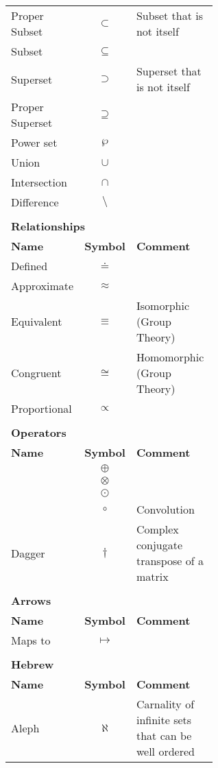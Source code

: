 \documentclass[12pt, english]{book}
\begin{document}
\begin{tabularx}{\textwidth}{ l c p{0.6\linewidth}}
 		Proper Subset 			& $\subset$			& Subset that is not itself \\
 		Subset 					& $\subseteq$		& \\
 		Superset 				& $\supset$ 		& Superset that is not itself\\
 		Proper Superset 		& $\supseteq$		& \\
 		Power set				& $\wp$				& \\
 		Union 					& $\cup$			& \\
 		Intersection			& $\cap$			& \\
 		Difference				& $\setminus$		& \\
 		\hline
 		
 		& & \\
 		\multicolumn{3}{l}{\textbf{{\large Relationships}}} \\ [10pt]
 		\hline
 		\textbf{Name} & \textbf{Symbol} & \textbf{Comment} \\
 		\hline
 		Defined 				& $\doteq$ 			& \\
 		Approximate 			& $\approx$			& \\
 		Equivalent				& $\equiv$	 		& Isomorphic (Group Theory) \\
 		Congruent 				& $\cong$			& Homomorphic (Group Theory) \\
 		Proportional 			& $\propto$			& \\
 		
 		& & \\
 		\multicolumn{3}{l}{\textbf{{\large Operators}}} \\ [10pt]
 		\hline
 		\textbf{Name} & \textbf{Symbol} & \textbf{Comment} \\
 		\hline
 		& $\oplus$ & \\
 		& $\otimes$ & \\
 		& $\odot$ & \\
 		& $\circ$ & Convolution \\
 		Dagger& $\dagger$ & Complex conjugate transpose of a matrix \\
 		\hline
 		
 		& & \\
 		\multicolumn{3}{l}{\textbf{{\large Arrows}}} \\ [10pt]
 		\hline
 		\textbf{Name} & \textbf{Symbol} & \textbf{Comment} \\
 		\hline
 		Maps to 				& $\mapsto$			& \\
 		
 		& & \\
 		\multicolumn{3}{l}{\textbf{{\large Hebrew}}} \\ [10pt]
 		\hline
 		\textbf{Name} & \textbf{Symbol} & \textbf{Comment} \\
 		\hline
 		Aleph					& $\aleph$			& Carnality of infinite sets that can be well ordered \\
 		

\end{tabularx}
\end{document}
